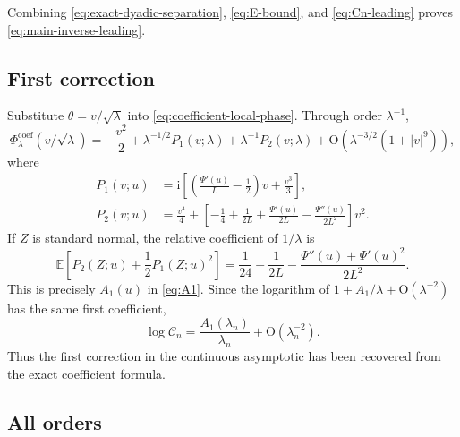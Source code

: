 \documentclass[11pt,oneside]{article}
\theoremstyle{definition}
\theoremstyle{remark}
\newcommand{\ii}{\mathrm i}
\newcommand{\E}{\mathbb E}
\newcommand{\bigO}{\mathrm O}
\newcommand{\CoeffMass}{\mathcal C}
\begin{document}
Combining \eqref{eq:exact-dyadic-separation}, \eqref{eq:E-bound}, and
\eqref{eq:Cn-leading} proves \eqref{eq:main-inverse-leading}.

\subsection{First correction}

Substitute $\theta=v/\sqrt\lambda$ into \eqref{eq:coefficient-local-phase}.  Through order
$\lambda^{-1}$,
\begin{equation}
 \Phi^{\mathrm{coef}}_\lambda(v/\sqrt\lambda)
 =-\frac{v^2}{2}+\lambda^{-1/2}P_1(v;\lambda)
 +\lambda^{-1}P_2(v;\lambda)
 +\bigO\!\left(\lambda^{-3/2}(1+|v|^9)\right),
\label{eq:phase-first-expansion}
\end{equation}
where
\begin{align}
 P_1(v;u)
 &=\ii\left[
 \left(\frac{\Psi'(u)}L-\frac12\right)v+\frac{v^3}{3}
 \right],                                                   \label{eq:P1}\\
 P_2(v;u)
 &=\frac{v^4}{4}+
 \left[-\frac14+\frac1{2L}+\frac{\Psi'(u)}{2L}
 -\frac{\Psi''(u)}{2L^2}\right]v^2.                       \label{eq:P2}
\end{align}
If $Z$ is standard normal, the relative coefficient of $1/\lambda$ is
\begin{equation}
 \E\left[P_2(Z;u)+\frac12P_1(Z;u)^2\right]
 =\frac1{24}+\frac1{2L}
 -\frac{\Psi''(u)+\Psi'(u)^2}{2L^2}.
\label{eq:first-Gaussian-contraction}
\end{equation}
This is precisely $A_1(u)$ in \eqref{eq:A1}.  Since the logarithm of
$1+A_1/\lambda+\bigO(\lambda^{-2})$ has the same first coefficient,
\begin{equation}
 \log\CoeffMass_n=
 \frac{A_1(\lambda_n)}{\lambda_n}+\bigO(\lambda_n^{-2}).
\label{eq:Cn-first}
\end{equation}
Thus the first correction in the continuous asymptotic has been recovered from the exact coefficient formula.

\subsection{All orders}
\end{document}
